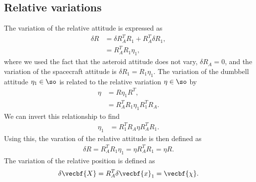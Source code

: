 \documentclass[11pt, reqno]{article}    %
\begin{document}
\subsection{Relative variations}\label{ssec:relative_variations}

The variation of the relative attitude is expressed as
\begin{align*}
    \delta R &= \delta R_A^T R_1 + R_A^T \delta R_1 , \\
    &= R_A^T R_1 \eta_1,
\end{align*}
where we used the fact that the asteroid attitude does not vary, \( \delta R_A = 0\), and the variation of the spacecraft attitude is \( \delta R_1 = R_1 \eta_1\).
The variation of the dumbbell attitude \( \eta_1 \in \so \) is related to the relative variation \( \eta \in \so \) by
\begin{align*}
    \eta &= R \eta_1 R^T ,\\
    &= R_A^T R_1 \eta_1 R_1^T R_A .
\end{align*}
We can invert this relationship to find
\begin{align*}
    \eta_1 &= R_1^T R_A \eta R_A^T R_1 .
\end{align*}
Using this, the varation of the relative attitude is then defined as
\begin{align}\label{eq:relative_attitude_variation}
    \delta R = R_A^T R_1 \eta_1 = \eta R_A^T R_1 = \eta R.
\end{align}
The variation of the relative position is defined as
\begin{align}\label{eq:relative_position_variation}
    \delta \vecbf{X} = R_A^T \delta \vecbf{x}_1 = \vecbf{\chi} .
\end{align}
\end{document}
